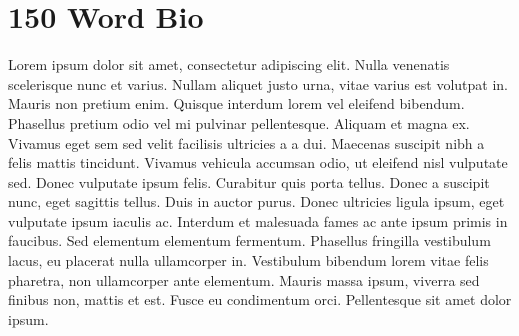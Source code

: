 \section*{150 Word Bio}
Lorem ipsum dolor sit amet, consectetur adipiscing elit. Nulla
venenatis scelerisque nunc et varius. Nullam aliquet justo urna,
vitae varius est volutpat in. Mauris non pretium enim. Quisque
interdum lorem vel eleifend bibendum. Phasellus pretium odio vel mi
pulvinar pellentesque. Aliquam et magna ex. Vivamus eget sem sed
velit facilisis ultricies a a dui. Maecenas suscipit nibh a felis
mattis tincidunt. Vivamus vehicula accumsan odio, ut eleifend nisl
vulputate sed. Donec vulputate ipsum felis. Curabitur quis porta
tellus. Donec a suscipit nunc, eget sagittis tellus. Duis in auctor
purus. Donec ultricies ligula ipsum, eget vulputate ipsum iaculis
ac. Interdum et malesuada fames ac ante ipsum primis in faucibus.
Sed elementum elementum fermentum. Phasellus fringilla vestibulum
lacus, eu placerat nulla ullamcorper in. Vestibulum bibendum lorem
vitae felis pharetra, non ullamcorper ante elementum. Mauris massa
ipsum, viverra sed finibus non, mattis et est. Fusce eu condimentum
orci. Pellentesque sit amet dolor ipsum. 
